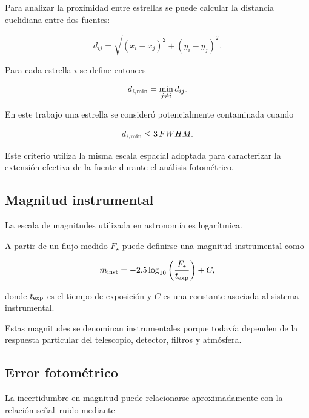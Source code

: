 \documentclass[12pt,letterpaper,oneside]{book}
\begin{document}
Para analizar la proximidad entre estrellas se puede calcular la distancia euclidiana entre dos fuentes:

\begin{equation}
d_{ij}
=
\sqrt{
(x_i-x_j)^2
+
(y_i-y_j)^2
}.
\end{equation}

Para cada estrella $i$ se define entonces

\[
d_{i,\rm min}
=
\min_{j\neq i}
d_{ij}.
\]

En este trabajo una estrella se consideró potencialmente contaminada cuando

\[
d_{i,\rm min}
\leq
3\,FWHM.
\]

Este criterio utiliza la misma escala espacial adoptada para caracterizar la extensión efectiva de la fuente durante el análisis fotométrico.



\subsection{Magnitud instrumental}

La escala de magnitudes utilizada en astronomía es logarítmica.

A partir de un flujo medido $F_{\star}$ puede definirse una magnitud instrumental como

\begin{equation}
m_{\rm inst}
=
-2.5
\log_{10}
\left(
\frac{F_{\star}}{t_{\rm exp}}
\right)
+
C,
\end{equation}

donde $t_{\rm exp}$ es el tiempo de exposición y $C$ es una constante asociada al sistema instrumental.

Estas magnitudes se denominan instrumentales porque todavía dependen de la respuesta particular del telescopio, detector, filtros y atmósfera.



\subsection{Error fotométrico}

La incertidumbre en magnitud puede relacionarse aproximadamente con la relación señal--ruido mediante
\end{document}
